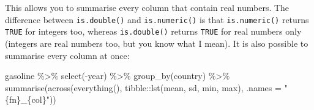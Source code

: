\documentclass[
]{article}
\newenvironment{Shaded}{\begin{snugshade}}{\end{snugshade}}
\newcommand{\AttributeTok}[1]{\textcolor[rgb]{0.77,0.63,0.00}{#1}}
\newcommand{\FunctionTok}[1]{\textcolor[rgb]{0.00,0.00,0.00}{#1}}
\newcommand{\NormalTok}[1]{#1}
\newcommand{\SpecialCharTok}[1]{\textcolor[rgb]{0.00,0.00,0.00}{#1}}
\newcommand{\StringTok}[1]{\textcolor[rgb]{0.31,0.60,0.02}{#1}}
\begin{document}
This allows you to summarise every column that contain real numbers. The difference between
\texttt{is.double()} and \texttt{is.numeric()} is that \texttt{is.numeric()} returns \texttt{TRUE} for integers too, whereas
\texttt{is.double()} returns \texttt{TRUE} for real numbers only (integers are real numbers too, but you know
what I mean). It is also possible to summarise every column at once:

\begin{Shaded}
\begin{Highlighting}[]
\NormalTok{gasoline }\SpecialCharTok{\%\textgreater{}\%}
  \FunctionTok{select}\NormalTok{(}\SpecialCharTok{{-}}\NormalTok{year) }\SpecialCharTok{\%\textgreater{}\%}
  \FunctionTok{group\_by}\NormalTok{(country) }\SpecialCharTok{\%\textgreater{}\%}
  \FunctionTok{summarise}\NormalTok{(}\FunctionTok{across}\NormalTok{(}\FunctionTok{everything}\NormalTok{(), tibble}\SpecialCharTok{::}\FunctionTok{lst}\NormalTok{(mean, sd, min, max), }\AttributeTok{.names =} \StringTok{"\{fn\}\_\{col\}"}\NormalTok{))}
\end{Highlighting}
\end{Shaded}
\end{document}
